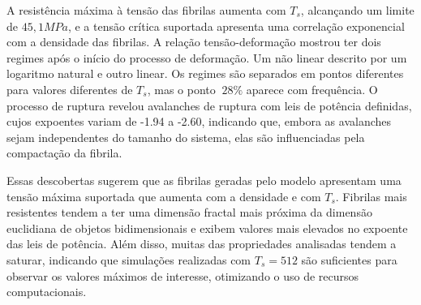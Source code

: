 \documentclass[11pt,a4paper]{article} %
\begin{document}
    A resistência máxima à tensão das fibrilas aumenta com \(T_{s}\), alcançando um limite de \(45,1 MPa\), e a tensão crítica  
    suportada apresenta uma correlação exponencial com a densidade das fibrilas. A relação tensão-deformação mostrou ter dois  
    regimes após o início do processo de deformação. Um não linear descrito por um logaritmo natural e outro linear. Os regimes 
    são separados em pontos diferentes para valores diferentes de \(T_{s}\), mas o ponto \(\ 28 \% \) aparece com frequência. 
    O processo de ruptura revelou avalanches de ruptura com leis de potência definidas, cujos expoentes variam de -1.94 a -2.60,  
    indicando que, embora as avalanches sejam independentes do tamanho do sistema, elas são influenciadas pela compactação da fibrila. 

    Essas descobertas sugerem que as fibrilas geradas pelo modelo apresentam uma tensão máxima suportada que aumenta com a  
    densidade e com \(T_{s}\). Fibrilas mais resistentes tendem a ter uma dimensão fractal mais próxima da dimensão  
    euclidiana de objetos bidimensionais e exibem valores mais elevados no expoente das leis de potência. Além disso, muitas  
    das propriedades analisadas tendem a saturar, indicando que simulações realizadas com \(T_{s} = 512\) são suficientes para  
    observar os valores máximos de interesse, otimizando o uso de recursos computacionais. 


\end{document}
